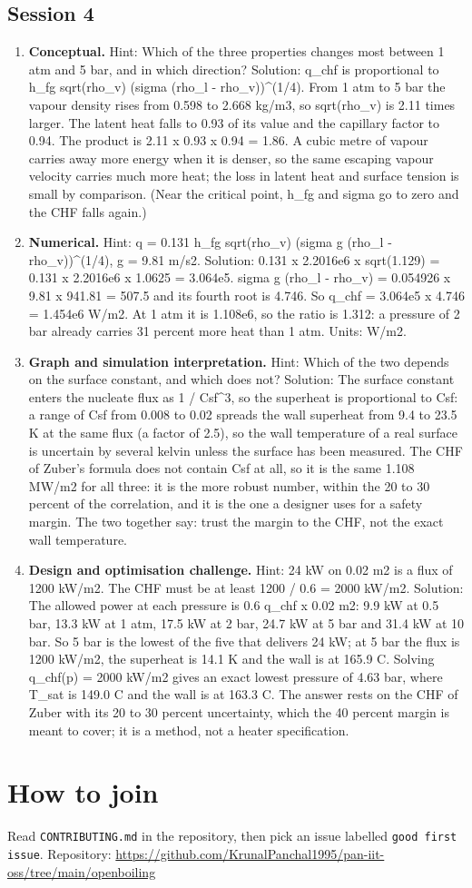 \documentclass[11pt,a4paper]{article}
\begin{document}
\subsection*{Session 4}
\begin{enumerate}[nosep]
\item \textbf{Conceptual.} Hint: Which of the three properties changes most between 1 atm and 5 bar, and in which direction? Solution: q\_chf is proportional to h\_fg sqrt(rho\_v) (sigma (rho\_l - rho\_v))\textasciicircum{}(1/4). From 1 atm to 5 bar the vapour density rises from 0.598 to 2.668 kg/m3, so sqrt(rho\_v) is 2.11 times larger. The latent heat falls to 0.93 of its value and the capillary factor to 0.94. The product is 2.11 x 0.93 x 0.94 = 1.86. A cubic metre of vapour carries away more energy when it is denser, so the same escaping vapour velocity carries much more heat; the loss in latent heat and surface tension is small by comparison. (Near the critical point, h\_fg and sigma go to zero and the CHF falls again.)
\item \textbf{Numerical.} Hint: q = 0.131 h\_fg sqrt(rho\_v) (sigma g (rho\_l - rho\_v))\textasciicircum{}(1/4), g = 9.81 m/s2. Solution: 0.131 x 2.2016e6 x sqrt(1.129) = 0.131 x 2.2016e6 x 1.0625 = 3.064e5. sigma g (rho\_l - rho\_v) = 0.054926 x 9.81 x 941.81 = 507.5 and its fourth root is 4.746. So q\_chf = 3.064e5 x 4.746 = 1.454e6 W/m2. At 1 atm it is 1.108e6, so the ratio is 1.312: a pressure of 2 bar already carries 31 percent more heat than 1 atm. Units: W/m2.
\item \textbf{Graph and simulation interpretation.} Hint: Which of the two depends on the surface constant, and which does not? Solution: The surface constant enters the nucleate flux as 1 / Csf\textasciicircum{}3, so the superheat is proportional to Csf: a range of Csf from 0.008 to 0.02 spreads the wall superheat from 9.4 to 23.5 K at the same flux (a factor of 2.5), so the wall temperature of a real surface is uncertain by several kelvin unless the surface has been measured. The CHF of Zuber's formula does not contain Csf at all, so it is the same 1.108 MW/m2 for all three: it is the more robust number, within the 20 to 30 percent of the correlation, and it is the one a designer uses for a safety margin. The two together say: trust the margin to the CHF, not the exact wall temperature.
\item \textbf{Design and optimisation challenge.} Hint: 24 kW on 0.02 m2 is a flux of 1200 kW/m2. The CHF must be at least 1200 / 0.6 = 2000 kW/m2. Solution: The allowed power at each pressure is 0.6 q\_chf x 0.02 m2: 9.9 kW at 0.5 bar, 13.3 kW at 1 atm, 17.5 kW at 2 bar, 24.7 kW at 5 bar and 31.4 kW at 10 bar. So 5 bar is the lowest of the five that delivers 24 kW; at 5 bar the flux is 1200 kW/m2, the superheat is 14.1 K and the wall is at 165.9 C. Solving q\_chf(p) = 2000 kW/m2 gives an exact lowest pressure of 4.63 bar, where T\_sat is 149.0 C and the wall is at 163.3 C. The answer rests on the CHF of Zuber with its 20 to 30 percent uncertainty, which the 40 percent margin is meant to cover; it is a method, not a heater specification.
\end{enumerate}

\section{How to join}
Read \texttt{CONTRIBUTING.md} in the repository, then pick an issue labelled \texttt{good first issue}. Repository: \url{https://github.com/KrunalPanchal1995/pan-iit-oss/tree/main/openboiling}
\end{document}

